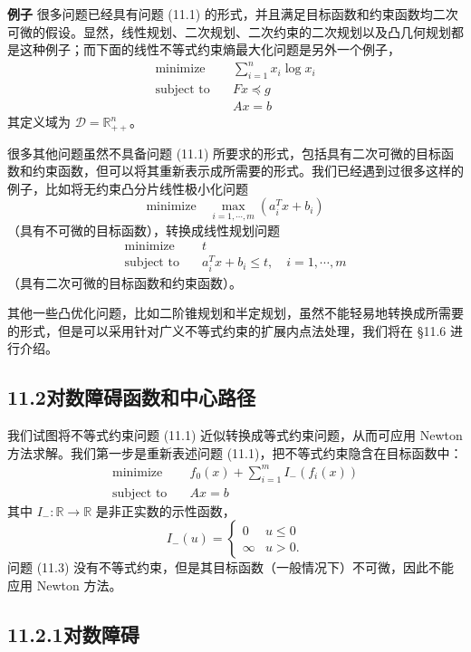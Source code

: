 \documentclass[UTF8, 12pt, fontset=fandol, oneside]{ctexart}
\begin{document}
\noindent\textbf{例子}\quad
很多问题已经具有问题 (11.1) 的形式，并且满足目标函数和约束函数均二次可微的假设。显然，线性规划、二次规划、二次约束的二次规划以及凸几何规划都是这种例子；而下面的线性不等式约束熵最大化问题是另外一个例子，
\[
\begin{aligned}
\text{minimize}\quad & \sum_{i=1}^n x_i\log x_i\\
\text{subject to}\quad & Fx\preceq g\\
& Ax=b
\end{aligned}
\]
其定义域为 $\mathcal{D}=\mathbb{R}_{++}^n$。

很多其他问题虽然不具备问题 (11.1) 所要求的形式，包括具有二次可微的目标函数和约束函数，但可以将其重新表示成所需要的形式。我们已经遇到过很多这样的例子，比如将无约束凸分片线性极小化问题
\[
\text{minimize}\quad \max_{i=1,\cdots,m}(a_i^Tx+b_i)
\]
（具有不可微的目标函数），转换成线性规划问题
\[
\begin{aligned}
\text{minimize}\quad & t\\
\text{subject to}\quad & a_i^Tx+b_i\leq t,\quad i=1,\cdots,m
\end{aligned}
\]
（具有二次可微的目标函数和约束函数）。

其他一些凸优化问题，比如二阶锥规划和半定规划，虽然不能轻易地转换成所需要的形式，但是可以采用针对广义不等式约束的扩展内点法处理，我们将在 \S11.6 进行介绍。

\subsection*{11.2\quad 对数障碍函数和中心路径}

我们试图将不等式约束问题 (11.1) 近似转换成等式约束问题，从而可应用 Newton 方法求解。我们第一步是重新表述问题 (11.1)，把不等式约束隐含在目标函数中：
\begin{equation}
\begin{aligned}
\text{minimize}\quad & f_0(x)+\sum_{i=1}^m I_-(f_i(x))\\
\text{subject to}\quad & Ax=b
\end{aligned}
\tag{11.3}
\end{equation}
其中 $I_-:\mathbb{R}\to\mathbb{R}$ 是非正实数的示性函数，
\[
I_-(u)=
\begin{cases}
0 & u\leq 0\\
\infty & u>0.
\end{cases}
\]
问题 (11.3) 没有不等式约束，但是其目标函数（一般情况下）不可微，因此不能应用 Newton 方法。

\subsection*{11.2.1\quad 对数障碍}
\end{document}

